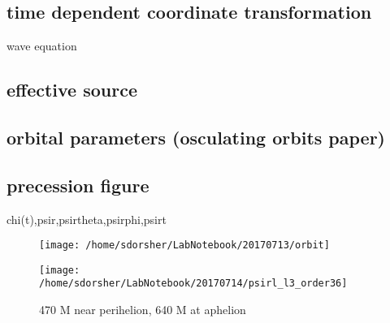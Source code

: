 \subsection{time dependent coordinate transformation}
wave equation
\subsection{effective source}
\subsection{orbital parameters (osculating orbits paper)}
\subsection{precession figure}
chi(t),psir,psirtheta,psirphi,psirt

\begin{figure}
\texttt{[image: /home/sdorsher/LabNotebook/20170713/orbit]}
\end{figure}




\begin{figure}
  \texttt{[image: /home/sdorsher/LabNotebook/20170714/psirl\_l3\_order36]}
  \caption{470 M near perihelion, 640 M at aphelion}
\end{figure}

